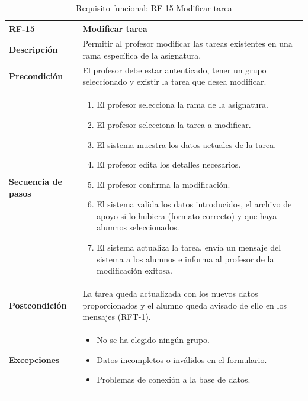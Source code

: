 \begin{table}[H]
\centering
\begin{tabularx}{\textwidth}{
  |>{\centering\arraybackslash}l
  |>{\centering\arraybackslash}X|}
\hline
\textbf{RF-15} & \textbf{Modificar tarea} \\ \hline

\textbf{Descripción} & Permitir al profesor modificar las tareas existentes en una rama específica de la asignatura. \\ \hline

\textbf{Precondición} & El profesor debe estar autenticado, tener un grupo seleccionado y existir la tarea que desea modificar. \\ \hline

\textbf{Secuencia de pasos} & 
\begin{enumerate}
  \item El profesor selecciona la rama de la asignatura.
  \item El profesor selecciona la tarea a modificar.
  \item El sistema muestra los datos actuales de la tarea.
  \item El profesor edita los detalles necesarios.
  \item El profesor confirma la modificación.
  \item El sistema valida los datos introducidos, el archivo de apoyo si lo hubiera (formato correcto) y que haya alumnos seleccionados.
  \item El sistema actualiza la tarea, envía un mensaje del sistema a los alumnos e informa al profesor de la modificación exitosa.
\end{enumerate} \\ \hline

\textbf{Postcondición} & La tarea queda actualizada con los nuevos datos proporcionados y el alumno queda avisado de ello en los mensajes (RFT-1). \\ \hline

\textbf{Excepciones} & 
\begin{itemize}
  \item No se ha elegido ningún grupo.
  \item Datos incompletos o inválidos en el formulario.
  \item Problemas de conexión a la base de datos.
\end{itemize} \\ \hline
\end{tabularx}
\caption{Requisito funcional: RF-15 Modificar tarea}
\end{table}

